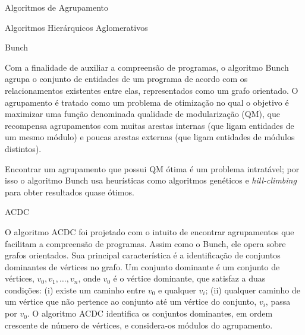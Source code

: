 \begin{chapter}{Algoritmos de Agrupamento}
\begin{section}{Algoritmos Hierárquicos Aglomerativos}
\end{section}

\begin{section}{Bunch}

Com a finalidade de auxiliar a compreensão de programas, o algoritmo Bunch \cite{Mancoridis1998} agrupa o conjunto de entidades de um programa de acordo com os relacionamentos existentes entre elas, representados como um grafo orientado. O agrupamento é tratado como um problema de otimização no qual o objetivo é maximizar uma função denominada qualidade de modularização (QM), que recompensa agrupamentos com muitas arestas internas (que ligam entidades de um mesmo módulo) e poucas arestas externas (que ligam entidades de módulos distintos).


Encontrar um agrupamento que possui QM ótima é um problema intratável; por isso o algoritmo Bunch usa heurísticas como algoritmos genéticos e \emph{hill-climbing} para obter resultados quase ótimos.

\end{section}

\begin{section}{ACDC}

O algoritmo ACDC \cite{Tzerpos2000} foi projetado com o intuito de encontrar agrupamentos que facilitam a compreensão de programas. Assim como o Bunch, ele opera sobre grafos orientados. Sua principal característica é a identificação de conjuntos dominantes de vértices no grafo. Um conjunto dominante é um conjunto de vértices, $v_0, v_1, \ldots{}, v_n$, onde $v_0$ é o vértice dominante, que satisfaz a duas condições: (i) existe um caminho entre $v_0$ e qualquer $v_i$; (ii) qualquer caminho de um vértice que não pertence ao conjunto até um vértice do conjunto, $v_i$, passa por $v_0$. O algoritmo ACDC identifica os conjuntos dominantes, em ordem crescente de número de vértices, e considera-os módulos do agrupamento. 

	
\end{section}	

\end{chapter}


